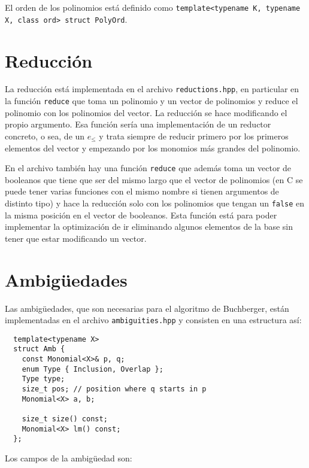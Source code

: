 \documentclass[12pt]{report}
\theoremstyle{customstyle}
\theoremstyle{factstyle}
\newcommand\cpp{C\nolinebreak[4]\hspace{-.05em}\raisebox{.4ex}{\relsize{-3}{\textbf{++}}}\xspace}
\begin{document}
El orden de los polinomios está definido como \texttt{template<typename K, typename X, class ord> struct PolyOrd}.

\section{Reducción}

La reducción está implementada en el archivo \texttt{reductions.hpp}, en particular en la función \texttt{reduce} que toma un polinomio y un vector de polinomios y reduce el polinomio con los polinomios del vector. La reducción se hace modificando el propio argumento. Esa función sería una implementación de un reductor concreto, o sea, de un $e_≤$ y trata siempre de reducir primero por los primeros elementos del vector y empezando por los monomios más grandes del polinomio.

En el archivo también hay una función \texttt{reduce} que además toma un vector de booleanos que tiene que ser del mismo largo que el vector de polinomios (en \cpp se puede tener varias funciones con el mismo nombre si tienen argumentos de distinto tipo) y hace la reducción solo con los polinomios que tengan un \texttt{false} en la misma posición en el vector de booleanos. Esta función está para poder implementar la optimización de ir eliminando algunos elementos de la base sin tener que estar modificando un vector.

\section{Ambigüedades}

Las ambigüedades, que son necesarias para el algoritmo de Buchberger, están implementadas en el archivo \texttt{ambiguities.hpp} y consisten en una estructura así:

\begin{verbatim}
  template<typename X>
  struct Amb {
    const Monomial<X>& p, q;
    enum Type { Inclusion, Overlap };
    Type type;
    size_t pos; // position where q starts in p
    Monomial<X> a, b;

    size_t size() const;
    Monomial<X> lm() const;
  };
\end{verbatim}

Los campos de la ambigüedad son:
\end{document}
